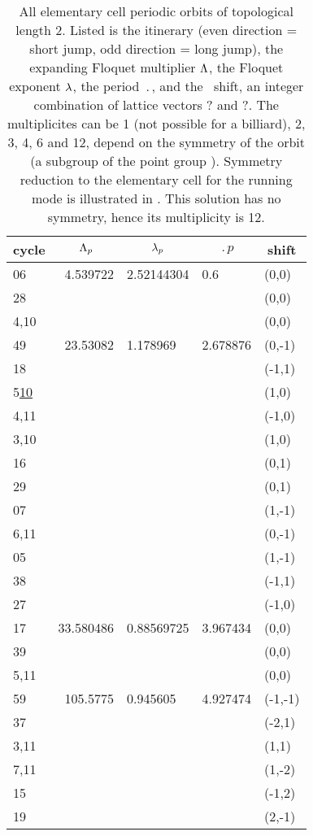 
\begin{table}
\centering
\caption[]{
All elementary cell periodic orbits of topological length 2. Listed is
the itinerary (even direction = short jump, odd direction = long jump),
the expanding Floquet multiplier $\Lambda$,
the Floquet exponent $\lambda$,
the period $\period{}$,
and
the \rpo\ shift, an integer combination of lattice vectors ? and ?. The
multiplicites can be 1 (not possible for a billiard), 2, 3, 4, 6 and 12,
depend on the symmetry of the orbit (a subgroup of the point group ).
Symmetry reduction to the elementary cell for the running mode 
is illustrated in . This solution has no
symmetry, hence its multiplicity is 12.
    }
    \begin{tabular}{l|r|l|l|l}
    \multicolumn{1}{c}{cycle}
    & \multicolumn{1}{|c|}{$\Lambda_p$}
      & \multicolumn{1}{c|}{$\lambda_p$}
       & \multicolumn{1}{c|}{$\period{p}$}
          & \multicolumn{1}{c}{shift} \\
    \hline
06  & 4.539722 & 2.52144304
                 & 0.6      & (0,0)  \\
28  &          & &          & (0,0)  \\
4,10  &        & &          & (0,0) \\
    \hline
49   & 23.53082 & 1.178969
                 & 2.678876 & (0,-1) \\
18   &         & &          & (-1,1)   \\
5\underline{10} &         & &          & (1,0)  \\
4,11 &         & &          & (-1,0)  \\
3,10 &         & &          & (1,0)  \\
16 &           & &          & (0,1) \\
29 &           & &          & (0,1) \\
07 &           & &          & (1,-1) \\
6,11 &         & &          & (0,-1)  \\
05 &           & &          & (1,-1) \\
38 &           & &          & (-1,1) \\
27 &           & &          & (-1,0)  \\
    \hline
17 & 33.580486 & 0.88569725
                 & 3.967434 & (0,0) \\
39 &           & &          & (0,0) \\
5,11 &         & &          & (0,0) \\
    \hline
59   & 105.5775 & 0.945605
                  &  4.927474 & (-1,-1) \\
37   &          & &         & (-2,1) \\
3,11 &          & &         & (1,1) \\
7,11 &          & &         & (1,-2) \\
15  &           & &         & (-1,2) \\
19   &          & &         & (2,-1) \\
	\hline
    \end{tabular}
\label{tab:ListLength2}
\end{table}
